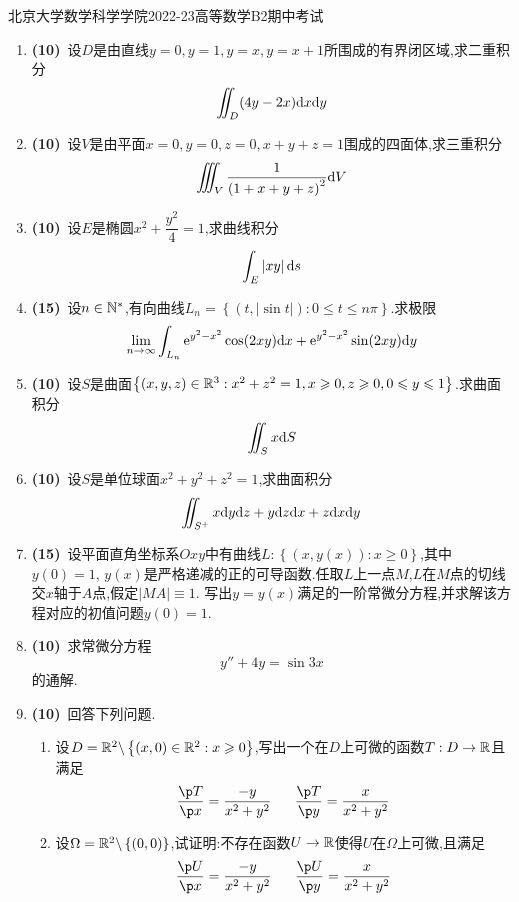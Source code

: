 \documentclass{ctexart}
\begin{document}
\pagestyle{empty}
\begin{center}\Large
    北京大学数学科学学院2022-23高等数学B2期中考试
\end{center}
\begin{enumerate}[leftmargin=*,label=\textbf{\arabic*.}]
    \item \textbf{(10)}\ 设$D$是由直线$y=0,y=1,y=x,y=x+1$所围成的有界闭区域,求二重积分
        \[\iint_D(4y-2x)\mathrm{d} x\mathrm{d} y\]
    \item \textbf{(10)}\ 设$V$是由平面$x=0,y=0,z=0,x+y+z=1$围成的四面体,求三重积分
        \[\iiint_V\dfrac{1}{\left(1+x+y+z\right)^2}\mathrm{d} V\]
    \item \textbf{(10)}\ 设$E$是椭圆$x^2+\dfrac{y^2}{4}=1$,求曲线积分
        \[\int_E\left|xy\right|\mathrm{d} s\]
    \item \textbf{(15)}\ 设$n\in\mathbb{N}^*$,有向曲线$L_n=\left\{\left(t,\left|\sin t\right|\right):0\leqslant t\leqslant n\pi\right\}$.求极限
        \[\lim_{n\to\infty}\int_{L_n}\mathrm{e}^{y^2-x^2}\cos(2xy)\mathrm{d} x+\mathrm{e}^{y^2-x^2}\sin(2xy)\mathrm{d} y\]
    \item \textbf{(10)}\ 设$S$是曲面$\left\{(x,y,z)\in\mathbb{R}^3:x^2+z^2=1,x\geqslant 0,z\geqslant 0,0\leqslant y\leqslant 1\right\}$.求曲面积分
        \[\iint_Sx\mathrm{d} S\]
    \item \textbf{(10)}\ 设$S$是单位球面$x^2+y^2+z^2=1$,求曲面积分
        \[\iint_{S^+}x\mathrm{d} y\mathrm{d} z+y\mathrm{d} z\mathrm{d} x+z\mathrm{d} x\mathrm{d} y\]
    \item \textbf{(15)}\ 设平面直角坐标系$Oxy$中有曲线$L:\left\{(x,y(x)):x\geqslant0\right\}$,其中$y(0)=1$,%
        $y(x)$是严格递减的正的可导函数.任取$L$上一点$M$,$L$在$M$点的切线交$x$轴于$A$点,假定$\left|MA\right|\equiv1$.%
        写出$y=y(x)$满足的一阶常微分方程,并求解该方程对应的初值问题$y(0)=1$.
    \item \textbf{(10)}\ 求常微分方程
        \[y''+4y=\sin3x\]
        的通解.
    \item \textbf{(10)}\ 回答下列问题.
        \begin{enumerate}[label=\tbf{(\arabic*)}]
            \item 设$D=\mathbb{R}^2\backslash\left\{(x,0)\in\mathbb{R}^2:x\geqslant 0\right\}$,写出一个在$D$上可微的函数$T:D\to\mathbb{R}$且满足
                \[\dfrac{\p T}{\p x}=\dfrac{-y}{x^2+y^2}\ \ \ \ \ \dfrac{\p T}{\p y}=\dfrac{x}{x^2+y^2}\]
            \item 设$\Omega=\mathbb{R}^2\backslash\left\{(0,0)\right\}$,试证明:不存在函数$U\to\mathbb{R}$使得$U$在$\Omega$上可微,且满足
                \[\dfrac{\p U}{\p x}=\dfrac{-y}{x^2+y^2}\ \ \ \ \ \dfrac{\p U}{\p y}=\dfrac{x}{x^2+y^2}\]
        \end{enumerate}
\end{enumerate}
\end{document}
